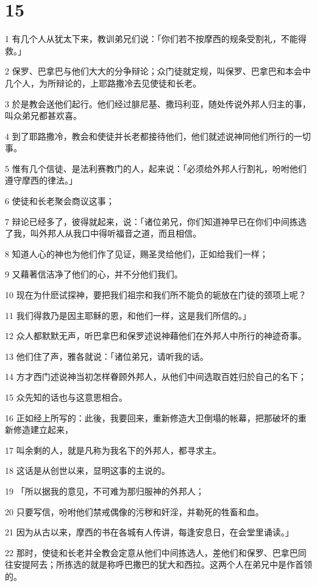 \chapter{15}

\par 1 有几个人从犹太下来，教训弟兄们说：「你们若不按摩西的规条受割礼，不能得救。」
\par 2 保罗、巴拿巴与他们大大的分争辩论；众门徒就定规，叫保罗、巴拿巴和本会中几个人，为所辩论的，上耶路撒冷去见使徒和长老。
\par 3 於是教会送他们起行。他们经过腓尼基、撒玛利亚，随处传说外邦人归主的事，叫众弟兄都甚欢喜。
\par 4 到了耶路撒冷，教会和使徒并长老都接待他们，他们就述说神同他们所行的一切事。
\par 5 惟有几个信徒、是法利赛教门的人，起来说：「必须给外邦人行割礼，吩咐他们遵守摩西的律法。」
\par 6 使徒和长老聚会商议这事；
\par 7 辩论已经多了，彼得就起来，说：「诸位弟兄，你们知道神早已在你们中间拣选了我，叫外邦人从我口中得听福音之道，而且相信。
\par 8 知道人心的神也为他们作了见证，赐圣灵给他们，正如给我们一样；
\par 9 又藉著信洁净了他们的心，并不分他们我们。
\par 10 现在为什麽试探神，要把我们祖宗和我们所不能负的轭放在门徒的颈项上呢？
\par 11 我们得救乃是因主耶稣的恩，和他们一样，这是我们所信的。」
\par 12 众人都默默无声，听巴拿巴和保罗述说神藉他们在外邦人中所行的神迹奇事。
\par 13 他们住了声，雅各就说：「诸位弟兄，请听我的话。
\par 14 方才西门述说神当初怎样眷顾外邦人，从他们中间选取百姓归於自己的名下；
\par 15 众先知的话也与这意思相合。
\par 16 正如经上所写的：此後，我要回来，重新修造大卫倒塌的帐幕，把那破坏的重新修造建立起来，
\par 17 叫余剩的人，就是凡称为我名下的外邦人，都寻求主。
\par 18 这话是从创世以来，显明这事的主说的。
\par 19 「所以据我的意见，不可难为那归服神的外邦人；
\par 20 只要写信，吩咐他们禁戒偶像的污秽和奸淫，并勒死的牲畜和血。
\par 21 因为从古以来，摩西的书在各城有人传讲，每逢安息日，在会堂里诵读。」
\par 22 那时，使徒和长老并全教会定意从他们中间拣选人，差他们和保罗、巴拿巴同往安提阿去；所拣选的就是称呼巴撒巴的犹大和西拉。这两个人在弟兄中是作首领的。
